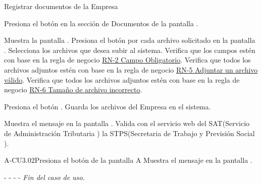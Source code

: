 	\begin{UCtrayectoria}{Registrar documentos de la Empresa}
	
	    \UCpaso[\UCactor] Presiona el botón  en la sección de Documentos de la pantalla .

		\UCpaso[\UCsist] Muestra la pantalla . 
		\UCpaso[\UCactor] Presiona el botón  por cada archivo solicitado en la pantalla .
		\UCpaso[\UCactor] Selecciona los archivos que desea subir al sistema. 
		\UCpaso[\UCsist] Verifica que los campos estén con base en la regla de negocio \hyperlink{RN2}{RN-2 Campo Obligatorio}. 
		\UCpaso[\UCsist] Verifica que todos los archivos adjuntos estén con base en la regla de negocio \hyperlink{RN5}{RN-5 Adjuntar un archivo válido}. 
	    \UCpaso[\UCsist] Verifica que todos los archivos adjuntos estén con base en la regla de negocio \hyperlink{RN6}{RN-6 Tamaño de archivo incorrecto}. 
		
		\UCpaso[\UCactor] Presiona el botón . 
		\UCpaso[\UCsist] Guarda los archivos del Empresa en el sistema. 
		
		\UCpaso[\UCsist] Muestra el mensaje  en la pantalla .
		\UCpaso[\UCsist] Valida con el servicio web del SAT(Servicio de Administración Tributaria ) la STPS(Secretaria de Trabajo y Previsión Social ).

		
	\end{UCtrayectoria}
	




	
	

	
	\begin{UCtrayectoriaA}{A-CU3.02}{Presiona el botón  de la pantalla   }{A}
		\UCpaso[\UCsist] Muestra el mensaje  en la pantalla .
		\item[- -] - - {\em Fin del caso de uso.} 
	\end{UCtrayectoriaA}


